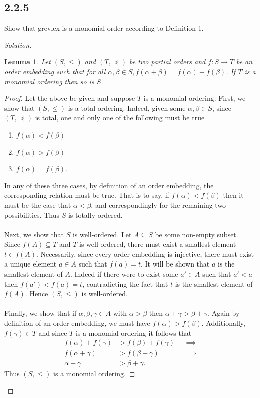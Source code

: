 \documentclass[]{article}
\newtheorem{lemma}{Lemma}
\newcommand\<{\langle}
\renewcommand\>{\rangle}
\newenvironment{solution}
{
	\begin{proof}[Solution] \text{ }
		\\
	}
	{
	\end{proof}
}
\begin{document}
\subsection*{2.2.5} Show that grevlex is a monomial order according to Definition 1.
\begin{solution}
	\begin{lemma}
		Let $\left(S, \leq\right)$ and $\left(T, \preceq\right)$ be two partial orders and $f : S \to T$ be an order embedding such that for all $\alpha, \beta \in S, f(\alpha + \beta) = f(\alpha) + f(\beta)$. If $T$ is a monomial ordering then so is $S$.
	\end{lemma}
	\begin{proof}
		Let the above be given and suppose $T$ is a monomial ordering. First, we show that $\left(S, \leq\right)$ is a total ordering. Indeed, given some $\alpha, \beta \in S$, since $\left(T, \preceq\right)$ is total, one and only one of the following must be true
		\begin{enumerate}
			\item $f(\alpha) < f(\beta)$
			\item $f(\alpha) > f(\beta)$
			\item $f(\alpha) = f(\beta)$.
		\end{enumerate}
		In any of these three cases, \href{https://en.wikipedia.org/wiki/Order_embedding}{by definition of an order embedding}, the corresponding relation must be true. That is to say, if $f(\alpha) < f(\beta)$ then it must be the case that $\alpha < \beta$, and correspondingly for the remaining two possibilities. Thus $S$ is totally ordered.
		\\
		\\
		Next, we show that $S$ is well-ordered. Let $A \subseteq S$ be some non-empty subset. Since $f(A) \subseteq T$ and $T$ is well ordered, there must exist a smallest element $t \in f(A)$. Necessarily, since every order embedding is injective, there must exist a unique element $a \in A$ such that $f(a) = t$. It will be shown that $a$ is the smallest element of $A$. Indeed if there were to exist some $a' \in A$ such that $a' < a$ then $f(a') < f(a) = t$, contradicting the fact that $t$ is the smallest element of $f(A)$. Hence $\left(S, \leq\right)$ is well-ordered.
		\\
		\\
		Finally, we show that if $\alpha, \beta, \gamma \in A$ with $\alpha > \beta$ then $\alpha + \gamma > \beta + \gamma$. Again by definition of an order embedding, we must have $f(\alpha) > f(\beta)$. Additionally, $f(\gamma) \in T$ and since $T$ is a monomial ordering it follows that
		\begin{align*}
			f(\alpha) + f(\gamma) &> f(\beta) + f(\gamma) &&\implies \\
			f(\alpha + \gamma) &> f(\beta + \gamma) &&\implies \\
			\alpha + \gamma &> \beta + \gamma.
		\end{align*}
		Thus $(S, \leq)$ is a monomial ordering.
	\end{proof}
\end{solution}
\end{document}
